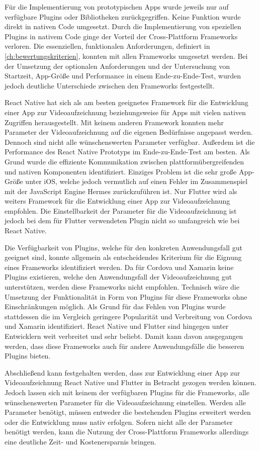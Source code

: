 Für die Implementierung von prototypischen Apps wurde jeweils nur auf verfügbare Plugins oder Bibliotheken zurückgegriffen.
Keine Funktion wurde direkt in nativen Code umgesetzt.
Durch die Implementierung von speziellen Plugins in nativem Code ginge der Vorteil der Cross-Plattform Frameworks verloren.
Die essenziellen, funktionalen Anforderungen, definiert in \autoref{ch:bewertungskriterien}, konnten mit allen Frameworks umgesetzt werden.
Bei der Umsetzung der optionalen Anforderungen und der Untersuchung von Startzeit, App-Größe und Performance in einem Ende-zu-Ende-Test, wurden jedoch deutliche Unterschiede zwischen den Frameworks festgestellt.

React Native hat sich als am besten geeignetes Framework für die Entwicklung einer App zur Videoaufzeichnung beziehungsweise für Apps mit vielen nativen Zugriffen herausgestellt.
Mit keinem anderen Framework konnten mehr Parameter der Videoaufzeichnung auf die eigenen Bedürfnisse angepasst werden.
Dennoch sind nicht alle wünschenswerten Parameter verfügbar.
Außerdem ist die Performance des React Native Prototyps im Ende-zu-Ende-Test am besten.
Als Grund wurde die effiziente Kommunikation zwischen plattformübergreifenden und nativen Komponenten identifiziert.
Einziges Problem ist die sehr große App-Größe unter iOS, welche jedoch vermutlich auf einen Fehler im Zusammenspiel mit der JavaScript Engine Hermes zurückzuführen ist.
Nur Flutter wird als weiters Framework für die Entwicklung einer App zur Videoaufzeichnung empfohlen.
Die Einstellbarkeit der Parameter für die Videoaufzeichnung ist jedoch bei dem für Flutter verwendeten Plugin nicht so umfangreich wie bei React Native.

Die Verfügbarkeit von Plugins, welche für den konkreten Anwendungsfall gut geeignet sind, konnte allgemein als entscheidendes Kriterium für die Eignung eines Frameworks identifiziert werden.
Da für Cordova und Xamarin keine Plugins existieren, welche den Anwendungsfall der Videoaufzeichnung gut unterstützen, werden diese Frameworks nicht empfohlen.
Technisch wäre die Umsetzung der Funktionalität in Form von Plugins für diese Frameworks ohne Einschränkungen möglich.
Als Grund für das Fehlen von Plugins wurde stattdessen die im Vergleich geringere Popularität und Verbreitung von Cordova und Xamarin identifiziert.
React Native und Flutter sind hingegen unter Entwicklern weit verbreitet und sehr beliebt.
Damit kann davon ausgegangen werden, dass diese Frameworks auch für andere Anwendungsfälle die besseren Plugins bieten.


Abschließend kann festgehalten werden, dass zur Entwicklung einer App zur Videoaufzeichnung React Native und Flutter in Betracht gezogen werden können.
Jedoch lassen sich mit keinem der verfügbaren Plugins für die Frameworks, alle wünschenswerten Parameter für die Videoaufzeichnung einstellen.
Werden alle Parameter benötigt, müssen entweder die bestehenden Plugins erweitert werden oder die Entwicklung muss nativ erfolgen.
Sofern nicht alle der Parameter benötigt werden, kann die Nutzung der Cross-Plattform Frameworks allerdings eine deutliche Zeit- und Kostenersparnis bringen.


